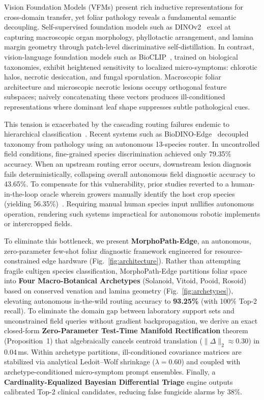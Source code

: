Vision Foundation Models (VFMs) present rich inductive representations for cross-domain transfer, yet foliar pathology reveals a fundamental semantic decoupling. Self-supervised foundation models such as DINOv2~\cite{oquab2023dinov2} excel at capturing macroscopic organ morphology, phyllotactic arrangement, and lamina margin geometry through patch-level discriminative self-distillation. In contrast, vision-language foundation models such as BioCLIP~\cite{stevens2024bioclip}, trained on biological taxonomies, exhibit heightened sensitivity to localized micro-symptoms: chlorotic halos, necrotic desiccation, and fungal sporulation. Macroscopic foliar architecture and microscopic necrotic lesions occupy orthogonal feature subspaces; naively concatenating these vectors produces ill-conditioned representations where dominant leaf shape suppresses subtle pathological cues.

This tension is exacerbated by the cascading routing failures endemic to hierarchical classification~\cite{silla2011survey}. Recent systems such as BioDINO-Edge~\cite{alsaadi2026biodino} decoupled taxonomy from pathology using an autonomous 13-species router. In uncontrolled field conditions, fine-grained species discrimination achieved only 79.35\% accuracy. When an upstream routing error occurs, downstream lesion diagnosis fails deterministically, collapsing overall autonomous field diagnostic accuracy to 43.65\%. To compensate for this vulnerability, prior studies reverted to a human-in-the-loop oracle wherein growers manually identify the host crop species (yielding 56.35\%)~\cite{alsaadi2026biodino}. Requiring manual human species input nullifies autonomous operation, rendering such systems impractical for autonomous robotic implements or intercropped fields.

To eliminate this bottleneck, we present \textbf{MorphoPath-Edge}, an autonomous, zero-parameter few-shot foliar diagnostic framework engineered for resource-constrained edge hardware (Fig.~\ref{fig:architecture}). Rather than attempting fragile cultigen species classification, MorphoPath-Edge partitions foliar space into \textbf{Four Macro-Botanical Archetypes} (Solanoid, Vitoid, Pooid, Rosoid) based on conserved venation and lamina geometry (Fig.~\ref{fig:archetypes}), elevating autonomous in-the-wild routing accuracy to \textbf{93.25\%} (with 100\% Top-2 recall). To eliminate the domain gap between laboratory support sets and unconstrained field queries without gradient backpropagation, we derive an exact closed-form \textbf{Zero-Parameter Test-Time Manifold Rectification} theorem (Proposition~1) that algebraically cancels centroid translation ($\|\Delta\|_2 \approx 0.30$) in 0.04\,ms. Within archetype partitions, ill-conditioned covariance matrices are stabilized via analytical Ledoit--Wolf shrinkage ($\lambda=0.60$) and coupled with archetype-conditioned micro-symptom prompt ensembles. Finally, a \textbf{Cardinality-Equalized Bayesian Differential Triage} engine outputs calibrated Top-2 clinical candidates, reducing false fungicide alarms by 38\%.

